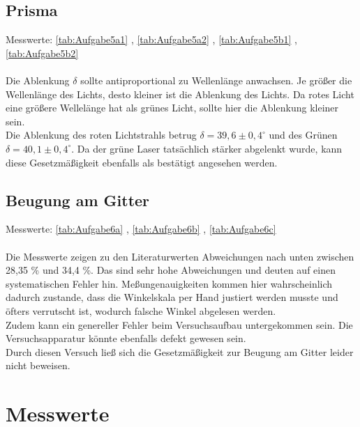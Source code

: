 \subsection{Prisma}

Messwerte: \autoref{tab:Aufgabe5a1} , \autoref{tab:Aufgabe5a2} , \autoref{tab:Aufgabe5b1} , \autoref{tab:Aufgabe5b2}\\ \\

Die Ablenkung $\delta$ sollte antiproportional zu Wellenlänge anwachsen. Je größer die Wellenlänge des Lichts, desto kleiner ist
die Ablenkung des Lichts. Da rotes Licht eine größere Wellelänge hat als grünes Licht, sollte hier die Ablenkung kleiner sein.\\
Die Ablenkung des roten Lichtstrahls betrug $\delta = 39,6 \pm 0,4 ^{\circ}$ und des Grünen $\delta = 40,1 \pm 0,4 ^{\circ}$. Da der grüne
Laser tatsächlich stärker abgelenkt wurde, kann diese Gesetzmäßigkeit ebenfalls als bestätigt angesehen werden.

\subsection{Beugung am Gitter}

Messwerte: \autoref{tab:Aufgabe6a} , \autoref{tab:Aufgabe6b} , \autoref{tab:Aufgabe6c} \\ \\

Die Messwerte zeigen zu den Literaturwerten Abweichungen nach unten zwischen 28,35 \% und 34,4 \%. Das sind sehr hohe Abweichungen 
und deuten auf einen systematischen Fehler hin. Meßungenauigkeiten kommen hier wahrscheinlich dadurch zustande, dass die Winkelskala per
Hand justiert werden musste und öfters verrutscht ist, wodurch falsche Winkel abgelesen werden.\\
Zudem kann ein genereller Fehler beim Versuchsaufbau untergekommen sein. Die Versuchsapparatur könnte ebenfalls defekt gewesen sein.\\
Durch diesen Versuch ließ sich die Gesetzmäßigkeit zur Beugung am Gitter leider nicht beweisen.

\section{Messwerte}
\label{sec:Messwerte}

